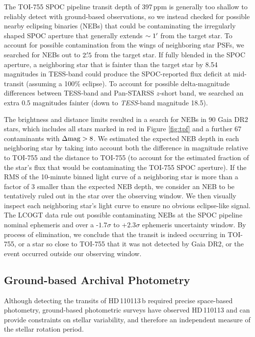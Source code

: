 \documentclass[fleqn,usenatbib]{mnras}
\newcommand{\Tstar}{HD\,110113}
\newcommand{\Tplanet}{HD\,110113\,b}
\begin{document}
The TOI-755 SPOC pipeline transit depth of 397\,ppm is generally too shallow to reliably detect with ground-based observations, so we instead checked for possible nearby eclipsing binaries (NEBs) that could be contaminating the irregularly shaped SPOC aperture that generally extends $\sim1\hbox{$^\prime$}$ from the target star.
To account for possible contamination from the wings of neighboring star PSFs, we searched for NEBs out to $2\hbox{$.\mkern-4mu^\prime$}5$ from the target star.
If fully blended in the SPOC aperture, a neighboring star that is fainter than the target star by 8.54 magnitudes in TESS-band could produce the SPOC-reported flux deficit at mid-transit (assuming a 100\% eclipse).
To account for possible delta-magnitude differences between TESS-band and Pan-STARSS $z$-short band, we searched an extra 0.5 magnitudes fainter (down to \textit{TESS}-band magnitude 18.5). 

The brightness and distance limits resulted in a search for NEBs in 90 Gaia DR2 stars, which includes all stars marked in red in Figure \ref{fig:tpf} and a further 67 contaminants with $\Delta{\rm mag}>8$.
We estimated the expected NEB depth in each neighboring star by taking into account both the difference in magnitude relative to TOI-755 and the distance to TOI-755 (to account for the estimated fraction of the star's flux that would be contaminating the TOI-755 SPOC aperture).
If the RMS of the 10-minute binned light curve of a neighboring star is more than a factor of 3 smaller than the expected NEB depth, we consider an NEB to be tentatively ruled out in the star over the observing window.
We then visually inspect each neighboring star's light curve to ensure no obvious eclipse-like signal.
The LCOGT data rule out possible contaminating NEBs at the SPOC pipeline nominal ephemeris and over a -$1.7\sigma$ to +$2.3\sigma$ ephemeris uncertainty window.
By process of elimination, we conclude that the transit is indeed occurring in TOI-755, or a star so close to TOI-755 that it was not detected by Gaia DR2, or the event occurred outside our observing window.

\subsection{Ground-based Archival Photometry}
Although detecting the transits of \Tplanet{} required precise space-based photometry, ground-based photometric surveys have observed \Tstar{} and can provide constraints on stellar variability, and therefore an independent measure of the stellar rotation period.
\end{document}
